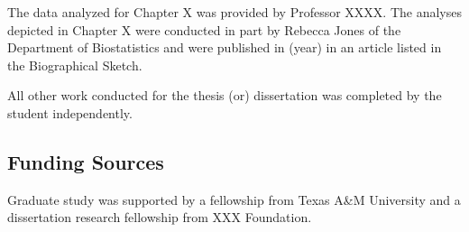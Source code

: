 \begin{contributors}
The data analyzed for Chapter X was provided by Professor XXXX. The analyses depicted in Chapter X were conducted in part by Rebecca Jones of the Department of Biostatistics and were published in (year) in an article listed in the Biographical Sketch.

All other work conducted for the thesis (or) dissertation was completed by the student independently.
\subsection*{Funding Sources}
Graduate study was supported by a fellowship from Texas A\&M University and a dissertation research fellowship from XXX Foundation. 

\end{contributors}
